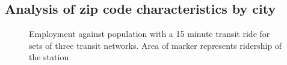 \documentclass[11pt]{article}
\begin{document}
\subsection{Analysis of zip code characteristics by city}
\vspace{-15pt}
\begin{figure}
\centering
{}

\vspace{-15pt}
\captionsetup{singlelinecheck=off, justification=centering}
\caption[]{Employment against population with a 15 minute transit ride for sets of three transit networks.\linebreak
Area of marker represents ridership of the station}\label{fig:localvars}
\end{figure}
\end{document}
